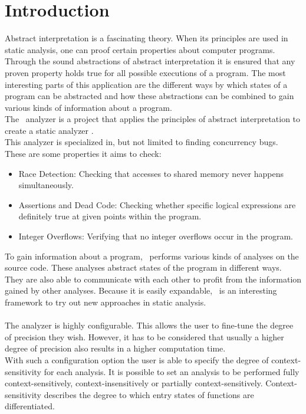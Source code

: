 
\chapter{Introduction}\label{chapter:introduction}
  Abstract interpretation is a fascinating theory. When its principles are used in static analysis, one can proof certain properties about computer programs. Through the sound abstractions of abstract interpretation it is ensured that any proven property holds true for all possible executions of a program. The most interesting parts of this application are the different ways by which states of a program can be abstracted and how these abstractions can be combined to gain various kinds of information about a program.\\
  The \gob\ analyzer is a project that applies the principles of abstract interpretation to create a static analyzer \parencite{goblintHome}.\\
  This analyzer is specialized in, but not limited to finding concurrency bugs. These are some properties it aims to check:
  \begin{itemize}
    \item Race Detection: Checking that accesses to shared memory never happens simultaneously.
    \item Assertions and Dead Code: Checking whether specific logical expressions are definitely true at given points within the program. 
    \item Integer Overflows: Verifying that no integer overflows occur in the program.
  \end{itemize}
  To gain information about a program, \gob\ performs various kinds of analyses on the source code. These analyses abstract states of the program in different ways. They are also able to communicate with each other to profit from the information gained by other analyses. Because it is easily expandable, \gob\ is an interesting framework to try out new approaches in static analysis.\\
  \\
  The analyzer is highly configurable. This allows the user to fine-tune the degree of precision they wish. However, it has to be considered that usually a higher degree of precision also results in a higher computation time.\\
  With such a configuration option the user is able to specify the degree of context-sensitivity for each analysis. It is possible to set an analysis to be performed fully context-sensitively, context-insensitively or partially context-sensitively. Context-sensitivity describes the degree to which entry states of functions are differentiated.\\
